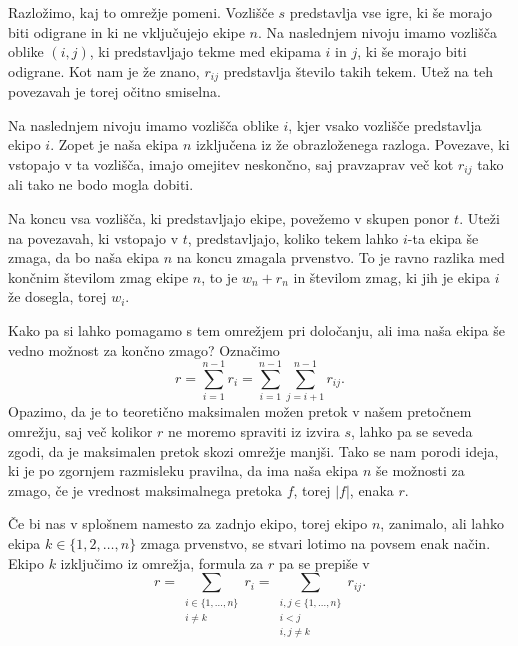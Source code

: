 \documentclass[mat1]{fmfdelo}
\begin{document}
Razložimo, kaj to omrežje pomeni. Vozlišče $s$ predstavlja vse igre, ki še morajo biti odigrane in ki ne vključujejo ekipe $n$. Na naslednjem nivoju imamo vozlišča oblike $(i,j)$, ki predstavljajo tekme med ekipama $i$ in $j$, ki še morajo biti odigrane.
Kot nam je že znano, $r_{ij}$ predstavlja število takih tekem. Utež na teh povezavah je torej očitno smiselna.

Na naslednjem nivoju imamo vozlišča oblike $i$, kjer vsako vozlišče predstavlja ekipo $i$. Zopet je naša ekipa $n$ izključena iz že obrazloženega razloga. Povezave, ki vstopajo v ta vozlišča, imajo omejitev neskončno, saj pravzaprav več kot $r_{ij}$ tako ali tako ne bodo mogla dobiti.

Na koncu vsa vozlišča, ki predstavljajo ekipe, povežemo v skupen ponor $t$. Uteži na povezavah, ki vstopajo v $t$, predstavljajo, koliko tekem lahko $i$-ta ekipa še zmaga, da bo naša ekipa $n$ na koncu zmagala prvenstvo. To je ravno razlika med končnim številom zmag ekipe $n$, to je $w_n + r_n$ in številom zmag,
ki jih je ekipa $i$ že dosegla, torej $w_i$.

Kako pa si lahko pomagamo s tem omrežjem pri določanju, ali ima naša ekipa še vedno možnost za končno zmago?
Označimo \[ r = \sum_{i = 1}^{n-1} r_i = \sum_{i=1}^{n-1} \sum_{j = i+1}^{n-1} r_{ij}. \] Opazimo, da je to teoretično maksimalen možen pretok v našem
pretočnem omrežju, saj več kolikor $r$ ne moremo spraviti iz izvira $s$, lahko pa se seveda zgodi, da je maksimalen pretok skozi omrežje manjši. Tako se nam porodi ideja, ki je po zgornjem razmisleku pravilna, da
ima naša ekipa $n$ še možnosti za zmago, če je vrednost maksimalnega pretoka $f$, torej $|f|$, enaka $r$.

\begin{opomba}
  Če bi nas v splošnem namesto za zadnjo ekipo, torej ekipo $n$, zanimalo, ali lahko ekipa $k \in \{1, 2, \dotsc, n\}$ zmaga prvenstvo, se stvari lotimo na povsem enak način. Ekipo $k$ izključimo iz omrežja, formula za $r$ pa se prepiše v
  \[ r = \sum_{\substack{i \in \{1, \dotsc, n\}\\i \neq k}} r_i = \sum_{\substack{i,j \in \{1, \dotsc, n\}\\ i < j\\ i, j\neq k}} r_{ij}. \]
\end{opomba}
\end{document}
